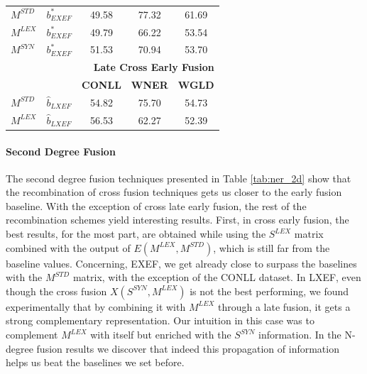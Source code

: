 \documentclass{llncs}
\newcommand\mlex{M^{\scriptscriptstyle LEX}}
\newcommand\mstd{M^{\scriptscriptstyle STD}}
\newcommand\slex{S^{\scriptscriptstyle LEX}}
\newcommand\ssyn{S^{\scriptscriptstyle SYN}}
\begin{document}
\begin{table}[!tb]
\begin{minipage}[t]{0.48\textwidth}
\begin{tabular}{@{}llccc@{}}
	\cmidrule{3-5}
$M^{\scriptscriptstyle STD}$ & $b^*_{\scriptscriptstyle EXEF}$          & 49.58 & 77.32 &            61.69             \\
	$M^{\scriptscriptstyle LEX}$                & $b^*_{\scriptscriptstyle EXEF}$      & 49.79 & 66.22 &            53.54             \\
	$M^{\scriptscriptstyle SYN}$                & $b^*_{\scriptscriptstyle EXEF}$           & 51.53 & 70.94 &            53.70             \\ \midrule
	                         &                & \multicolumn{3}{r}{\textbf{Late Cross Early Fusion}}  \\ \midrule
	                         &                & \textbf{CONLL} & \textbf{WNER}  &             \textbf{WGLD}             \\
	\cmidrule{3-5}
$M^{\scriptscriptstyle STD}$ &$\hat{b}_{\scriptscriptstyle LXEF}$           &  54.82   & 75.70 &            54.73             \\
	$M^{\scriptscriptstyle LEX}$                & $\hat{b}_{\scriptscriptstyle LXEF}$  & 56.53 & 62.27 &            52.39             \\ \bottomrule
\end{tabular}
\end{minipage}
\end{table}

\paragraph{Second Degree Fusion} 
The second degree fusion techniques presented in Table \ref{tab:ner_2d} show that the recombination of cross fusion techniques gets us closer to the early fusion baseline. With the exception of cross late early fusion, the rest of the recombination schemes yield interesting results. First, in cross early fusion, the best results, for the most part, are obtained while using the $\slex$ matrix combined with the output of $E(\mlex, \mstd)$, which is still far from the baseline values. Concerning, EXEF, we get already close to surpass the baselines with the $\mstd$ matrix, with the exception of the CONLL dataset. In LXEF, even though the cross fusion $X(\ssyn, \mlex)$ is not the best performing, we found experimentally that by combining it with $\mlex$ through a late fusion, it gets  a strong complementary representation. Our intuition in this case was to complement $\mlex$ with itself but enriched with the $\ssyn$ information. In the N-degree fusion results we discover that indeed this propagation of information helps us beat the baselines we set before.
\end{document}
